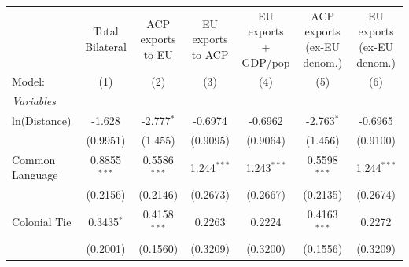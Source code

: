 
\begingroup
\centering
\begin{tabular}{lcccccc}
   \tabularnewline \midrule \midrule
                                & \makecell{Total\\Bilateral}    & \makecell{ACP exports\\to EU}    & \makecell{EU exports\\to ACP}    & \makecell{EU exports\\+ GDP/pop}    & \makecell{ACP exports\\(ex-EU denom.)}    & \makecell{EU exports\\(ex-EU denom.)} \\      
   Model:                       & (1)                            & (2)                              & (3)                              & (4)                                 & (5)                                       & (6)\\  
   \midrule
   \emph{Variables}\\
   ln(Distance)                 & -1.628                         & -2.777$^{*}$                     & -0.6974                          & -0.6962                             & -2.763$^{*}$                              & -0.6965\\   
                                & (0.9951)                       & (1.455)                          & (0.9095)                         & (0.9064)                            & (1.456)                                   & (0.9100)\\   
   Common Language              & 0.8855$^{***}$                 & 0.5586$^{***}$                   & 1.244$^{***}$                    & 1.243$^{***}$                       & 0.5598$^{***}$                            & 1.244$^{***}$\\   
                                & (0.2156)                       & (0.2146)                         & (0.2673)                         & (0.2667)                            & (0.2135)                                  & (0.2674)\\   
   Colonial Tie                 & 0.3435$^{*}$                   & 0.4158$^{***}$                   & 0.2263                           & 0.2224                              & 0.4163$^{***}$                            & 0.2272\\   
                                & (0.2001)                       & (0.1560)                         & (0.3209)                         & (0.3200)                            & (0.1556)                                  & (0.3209)\\   

\end{tabular}
